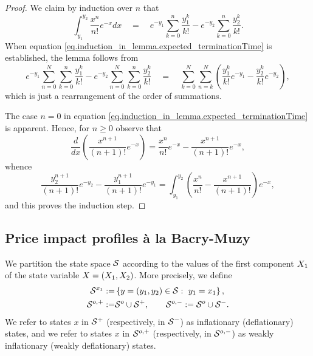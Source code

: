 \documentclass[10pt, article,table]{article}
\begin{document}
\begin{proof}
 We claim by induction over $n$ that 
 \begin{equation}\label{eq.induction_in_lemma.expected_terminationTime}
   \int_{y_1}^{y_2}
   \frac{x^{n}}{n!}e^{-x}dx
   \quad
  =
   \quad 
  e^{-y_1} \sum_{k=0}^{n} \frac{y_{1}^{k}}{k!}  -  e^{-y_2}\sum_{k=0}^{n}\frac{y_{2}^{k}}{k!}.
 \end{equation}
When equation \eqref{eq.induction_in_lemma.expected_terminationTime} is established, the lemma follows from 
\begin{equation*}
  e^{-y_1} \sum_{n=0}^{N}\sum_{k=0}^{n} \frac{y_{1}^{k}}{k!}  -  e^{-y_2}\sum_{n=0}^{N}\sum_{k=0}^{n}\frac{y_{2}^{k}}{k!}
 \quad  = \quad 
 \sum_{k=0}^{N}\sum_{n=k}^{N} \left(\frac{y_{1}^{k}}{k!}e^{-y_1}  -  \frac{y_{2}^{k}}{k!}e^{-y_2}\right),
\end{equation*}
which is just a rearrangement of the order of summations.

The case $n=0$ in equation \eqref{eq.induction_in_lemma.expected_terminationTime} is apparent. Hence, for $n\geq0$ observe that
\begin{equation*}
 \frac{d}{dx} \left( \frac{x^{n+1}}{(n+1)!}e^{-x} \right)
 = 
 \frac{x^{n}}{n!}e^{-x}  -  \frac{x^{n+1}}{(n+1)!}e^{-x},
\end{equation*}
whence
\begin{equation*}
 \frac{y_{2}^{n+1}}{(n+1)!}e^{-y_{2}}  -  \frac{y_{1}^{n+1}}{(n+1)!}e^{-y_{1}}
 =
 \int_{y_{1}}^{y_{2}}
 \left(\frac{x^{n}}{n!}  -  \frac{x^{n+1}}{(n+1)!}\right)e^{-x},
\end{equation*}
and this proves the induction step.
\end{proof}






\subsection{Price impact profiles \`a la Bacry-Muzy}\label{sec.impact_a_la_BM}
We partition the state space $\mathcal{S}$ according to the values of the first component $X_1$ of the state variable $X= (X_1, X_2)$. More precisely, we define
\begin{equation}\label{eq.partition_of_state_space}
\begin{split}
 \mathcal{S}^{x_1} := & \left\lbrace y=(y_1,y_2) \in \mathcal{S}: \, \, y_1 = x_1\right\rbrace,
 \\
 \mathcal{S}^{o,+} := & \mathcal{S}^{o} \cup \mathcal{S}^{+},
 \qquad
 \mathcal{S}^{o,-} := \mathcal{S}^{o} \cup \mathcal{S}^{-}.
\end{split}
\end{equation}
We refer to states $x$ in $\mathcal{S}^{+}$ (respectively, in $\mathcal{S}^{-}$) as inflationary (deflationary) states, and we refer to states $x$ in $\mathcal{S}^{o,+}$ (respectively, in $\mathcal{S}^{o,-}$) as weakly inflationary (weakly deflationary) states.
\end{document}

